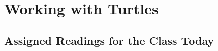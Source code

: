 \chapter{Working with Turtles\label{ch:intro_turtles}}



\setcounter{section}{-1}

\section{Assigned Readings for the Class Today}

